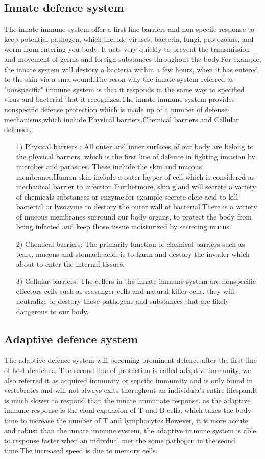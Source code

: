 \documentclass[12pt]{article}
\begin{document}
\subsection{Innate defence system}
The innate immune system offer a first-line barriers and non-specife response to keep potential pathogen, which include  viruses, bacteria, fungi, protozoans, and worm from entering you body. It acts very quickly to prevent the transmission and movement of germs and foreign substances throughout the body.For example, the innate system will destory a bacteria within a few hours, when it has entered to the skin via a sma;wound.The reson why the innate system referred as "nonspecific" immune system is that it responds in  the same way to specified virus and bacterial that it recognizes.The innate immune system provides nonspecific defense protection which is made up of a number of defense mechanisms,which include Physical barriers,Chemical barriers and Cellular defenses.
\begin{itemize}
    \item [1)] 
    Physical barriers : All outer and inner surfaces of our body are belong to the physical
    barriers, which is the first line of defence in fighting invasion by microbes and parasites. These include the skin and mucous membranes.Human skin include a outer layper of cell which is considered as mechanical barrier to infection.Furthermore, skin gland will secrete a variety of chemicals substances or enzyme,for example secrete oleic acid to kill bacterial or lysozyme to destory the outer wall of bacterial.There is a variety of mucous membranes surround our body organs, to protect the body from being infected and keep those tissue moisturized by secreting mucus.
    \item [2)]
    Chemical barriers: The primarily function of chemical barriers such as tears, mucous and stomach acid, is to harm and destory the invader which about to enter the internal tissues.
    \item [3)]
    Cellular barriers: The cellers in the innate immune system are nonspecific effectors cells such as scavanger cells and natural killer cells, they will neutralize  or destory those pathogens and substances that are likely dangerous to our body. 
\end{itemize}

\subsection{Adaptive defence system}
The adaptive defence system will becoming prominent defence after the first line of host denfence.
The second line of protection is called adaptive immunity, we also referred it as acquired immunity or sepcific immumity and is only found in vertebrates and will not always exits thorughout an individula’s entire lifespan.It is much slower to respond than the innate immunate response. as the adaptive immune response is the clonl expansion of T and B cells, which takes the body time to increase the number of T and  lymphocytes.However, it is more accute and robust than the innate immune system, the adaptive immune system is able to response faster when an indivdual met the some pathogen in the seond time.The increased speed is due to memory cells. 
\end{document}
